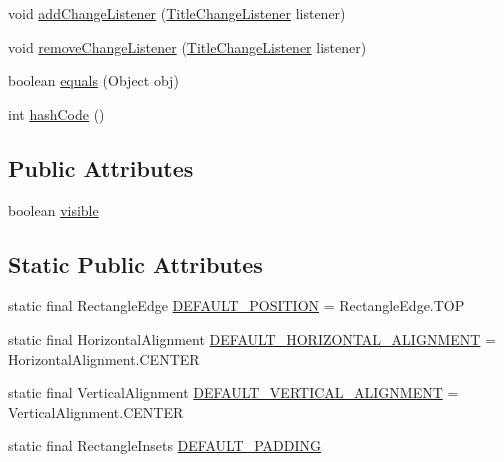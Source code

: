\begin{DoxyCompactItemize}
\item 
void \mbox{\hyperlink{classorg_1_1jfree_1_1chart_1_1title_1_1_title_aa1be01c6dcddd0dcb3095999524d529b}{add\+Change\+Listener}} (\mbox{\hyperlink{interfaceorg_1_1jfree_1_1chart_1_1event_1_1_title_change_listener}{Title\+Change\+Listener}} listener)
\item 
void \mbox{\hyperlink{classorg_1_1jfree_1_1chart_1_1title_1_1_title_a8ffdcfa02c763d2da74bba1070b3a879}{remove\+Change\+Listener}} (\mbox{\hyperlink{interfaceorg_1_1jfree_1_1chart_1_1event_1_1_title_change_listener}{Title\+Change\+Listener}} listener)
\item 
boolean \mbox{\hyperlink{classorg_1_1jfree_1_1chart_1_1title_1_1_title_a816cb57f8f1cbf9115a54c7b1cfea2ed}{equals}} (Object obj)
\item 
int \mbox{\hyperlink{classorg_1_1jfree_1_1chart_1_1title_1_1_title_af469f5e9ec0f7430ad2426b7c5fd61cb}{hash\+Code}} ()
\end{DoxyCompactItemize}
\subsection*{Public Attributes}
\begin{DoxyCompactItemize}
\item 
boolean \mbox{\hyperlink{classorg_1_1jfree_1_1chart_1_1title_1_1_title_a8f9f60ec3aba4b287ca8cd9c591cd179}{visible}}
\end{DoxyCompactItemize}
\subsection*{Static Public Attributes}
\begin{DoxyCompactItemize}
\item 
static final Rectangle\+Edge \mbox{\hyperlink{classorg_1_1jfree_1_1chart_1_1title_1_1_title_aaf86400949f6a1964ff7cf2e0a9fe04c}{D\+E\+F\+A\+U\+L\+T\+\_\+\+P\+O\+S\+I\+T\+I\+ON}} = Rectangle\+Edge.\+T\+OP
\item 
static final Horizontal\+Alignment \mbox{\hyperlink{classorg_1_1jfree_1_1chart_1_1title_1_1_title_ad414d444467ecf79bffc22e6aab8b022}{D\+E\+F\+A\+U\+L\+T\+\_\+\+H\+O\+R\+I\+Z\+O\+N\+T\+A\+L\+\_\+\+A\+L\+I\+G\+N\+M\+E\+NT}} = Horizontal\+Alignment.\+C\+E\+N\+T\+ER
\item 
static final Vertical\+Alignment \mbox{\hyperlink{classorg_1_1jfree_1_1chart_1_1title_1_1_title_a528777887b9717ae86562c3879c6b41a}{D\+E\+F\+A\+U\+L\+T\+\_\+\+V\+E\+R\+T\+I\+C\+A\+L\+\_\+\+A\+L\+I\+G\+N\+M\+E\+NT}} = Vertical\+Alignment.\+C\+E\+N\+T\+ER
\item 
static final Rectangle\+Insets \mbox{\hyperlink{classorg_1_1jfree_1_1chart_1_1title_1_1_title_adee13e1dee1df66a023632608641d249}{D\+E\+F\+A\+U\+L\+T\+\_\+\+P\+A\+D\+D\+I\+NG}}
\end{DoxyCompactItemize}
